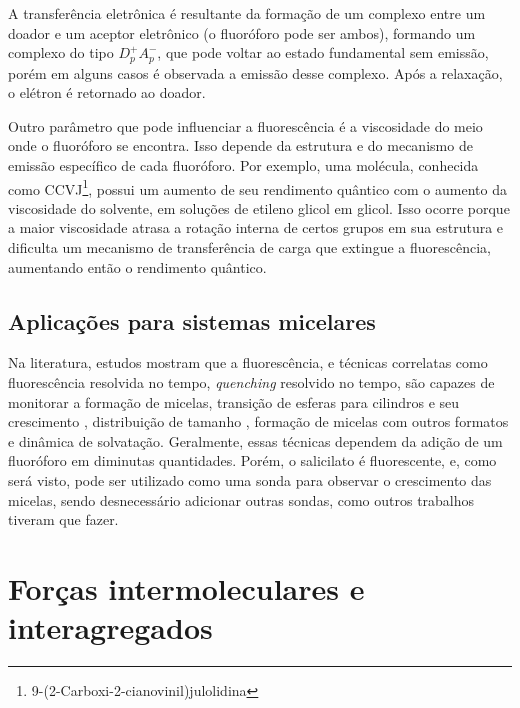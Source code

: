 		A transferência eletrônica é resultante da formação de um complexo entre um doador e um aceptor eletrônico (o fluoróforo pode ser ambos), formando um complexo do tipo \(D_p^+A_p^-\), que pode voltar ao estado fundamental sem emissão, porém em alguns casos é observada a emissão desse complexo. Após a relaxação, o elétron é retornado ao doador.  \cite{Lakowicz2006}
				
		Outro parâmetro que pode influenciar a fluorescência é a viscosidade do meio onde o fluoróforo se encontra.  Isso depende da estrutura e do mecanismo de emissão específico de cada fluoróforo. Por exemplo, uma molécula, conhecida como CCVJ\footnote{9-(2-Carboxi-2-cianovinil)julolidina}, possui um aumento de seu rendimento quântico com o aumento da viscosidade do solvente, em soluções de etileno glicol em glicol. Isso ocorre porque a maior viscosidade atrasa a rotação interna de certos grupos em sua estrutura e dificulta um mecanismo de transferência de carga que extingue a fluorescência, aumentando então o rendimento quântico. \cite{Lakowicz2006}
		
		\section{Aplicações para sistemas micelares}
		
		Na literatura, estudos mostram que a fluorescência, e técnicas correlatas como fluorescência resolvida no tempo, \emph{quenching} resolvido no tempo, são capazes de monitorar a formação de micelas\cite{Zettl2005, Alexandridis1995}, transição de esferas para cilindros e seu crescimento \cite{Vasilescu2004, Goel2010, Gao2011, Almgren1988a, Narayanan1997c}, distribuição de tamanho \cite{Gehlen1993}, formação de micelas com outros formatos\cite{Lima2013b} e dinâmica de solvatação\cite{Kumari2017a, Sen2005}. Geralmente, essas técnicas dependem da adição de um fluoróforo em diminutas quantidades. Porém, o salicilato é fluorescente\cite{ALLISON1964}, e, como será visto, pode ser utilizado como uma sonda para observar o crescimento das micelas, sendo desnecessário adicionar outras sondas, como outros trabalhos tiveram que fazer.\cite{Sen2005, Makhloufi1989}

		
	\chapter{Forças intermoleculares e interagregados}  \label{sec:forcas_intermoleculares}
	
